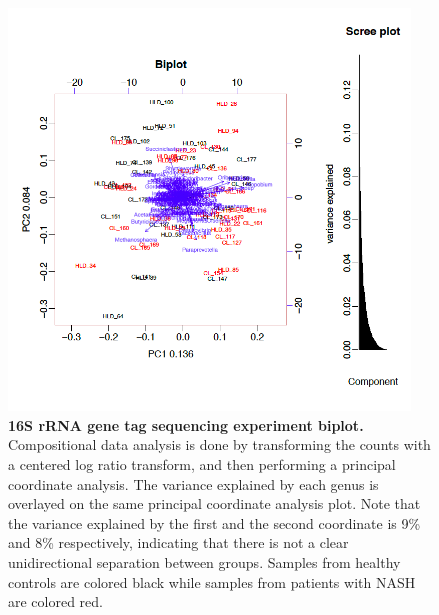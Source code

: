 \begin{figure}[h]
\begin{center}
\includegraphics[width=0.95\textwidth]{16s_biplot.png}
\caption[16S rRNA gene tag sequencing experiment biplot.]{\textbf{16S rRNA gene tag sequencing experiment biplot.} Compositional data analysis is done by transforming the counts with a centered log ratio transform, and then performing a principal coordinate analysis. The variance explained by each genus is overlayed on the same principal coordinate analysis plot. Note that the variance explained by the first and the second coordinate is 9\% and 8\% respectively, indicating that there is not a clear unidirectional separation between groups. Samples from healthy controls are colored black while samples from patients with NASH are colored red. }
\end{center}
\label{nafld_16s_biplot}
\end{figure}

